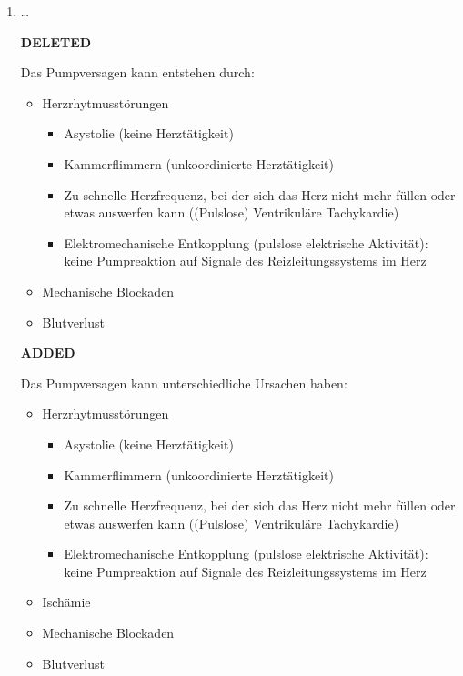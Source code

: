 \documentclass[
ngerman,
paper=a4,
asymmetric,
fontsize=10pt,
headings=small,
draft=false,
numbers=noenddot,
bibtotocnumbered,
footnotes=multiple,
]{scrreprt}
\newcommand{\jALT}{{\color{red}\sffamily\textbf{DELETED}\hrulefill\newline\newline}}
\newcommand{\jALTende}{\newline{\color{red}\rule{\linewidth}{2pt}\newline}}
\newcommand{\jNEU}{{\color{green}\sffamily\textbf{ADDED}\hrulefill\newline\newline}}
\newcommand{\jNEUende}{\newline{\color{green}\rule{\linewidth}{3pt}\newline}}
\begin{document}
\begin{enumerate}

\item \ldots

\jALT
{}

Das Pumpversagen kann entstehen durch:
 
 \begin{itemize}
  \item Herzrhytmusstörungen\begin{itemize}
    \item Asystolie (keine Herztätigkeit)
     \item Kammerflimmern (unkoordinierte Herztätigkeit)
     \item Zu schnelle Herzfrequenz, bei der sich das Herz
     nicht mehr füllen oder etwas auswerfen kann ((Pulslose)
     Ventrikuläre Tachykardie) 
     \item Elektromechanische
     Entkopplung (pulslose elektrische Aktivität): keine
     Pumpreaktion auf Signale des Reizleitungssystems im Herz
 \end{itemize}
  \item Mechanische Blockaden
  \item Blutverlust
 \end{itemize}
\jALTende

\jNEU
\Text
{\TxBeschreibung}
{%
Das Pumpversagen kann unterschiedliche Ursachen haben:
\begin{itemize}
  \item Herzrhytmusstörungen
 \begin{itemize}
    \item Asystolie (keine Herztätigkeit)
     \item Kammerflimmern (unkoordinierte Herztätigkeit)
     \item Zu schnelle Herzfrequenz, bei der sich das Herz
     nicht mehr füllen oder etwas auswerfen kann ((Pulslose)
     Ventrikuläre Tachykardie) 
     \item Elektromechanische
     Entkopplung (pulslose elektrische Aktivität): keine
     Pumpreaktion auf Signale des Reizleitungssystems im Herz
 \end{itemize}
  \item Ischämie
  \item Mechanische Blockaden
  \item Blutverlust
 \end{itemize}
}
{}
{}
{}
{}
\jNEUende


\end{enumerate}
\end{document}
